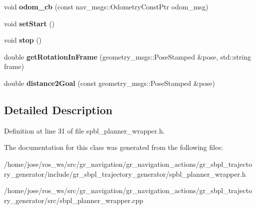 \begin{DoxyCompactItemize}
void {\bfseries odom\+\_\+cb} (const nav\+\_\+msgs\+::\+Odometry\+Const\+Ptr odom\+\_\+msg)
\item 
\mbox{\label{classgr__sbpl__trajectory__generator_1_1GRSBPLPlanner_af1167b856f9bb17b2ad2337726f94209}} 
void {\bfseries set\+Start} ()
\item 
\mbox{\label{classgr__sbpl__trajectory__generator_1_1GRSBPLPlanner_adb56bd9cd625ad10c048a82d8898860c}} 
void {\bfseries stop} ()
\item 
\mbox{\label{classgr__sbpl__trajectory__generator_1_1GRSBPLPlanner_a7956e2577d749607d1babf2b7821ec0e}} 
double {\bfseries get\+Rotation\+In\+Frame} (geometry\+\_\+msgs\+::\+Pose\+Stamped \&pose, std\+::string frame)
\item 
\mbox{\label{classgr__sbpl__trajectory__generator_1_1GRSBPLPlanner_a8fc1bca78a23e51ecc02fa119582dc7c}} 
double {\bfseries distance2\+Goal} (const geometry\+\_\+msgs\+::\+Pose\+Stamped \&pose)
\end{DoxyCompactItemize}


\subsection{Detailed Description}


Definition at line 31 of file spbl\+\_\+planner\+\_\+wrapper.\+h.



The documentation for this class was generated from the following files\+:\begin{DoxyCompactItemize}
\item 
/home/jose/ros\+\_\+ws/src/gr\+\_\+navigation/gr\+\_\+navigation\+\_\+actions/gr\+\_\+sbpl\+\_\+trajectory\+\_\+generator/include/gr\+\_\+sbpl\+\_\+trajectory\+\_\+generator/spbl\+\_\+planner\+\_\+wrapper.\+h\item 
/home/jose/ros\+\_\+ws/src/gr\+\_\+navigation/gr\+\_\+navigation\+\_\+actions/gr\+\_\+sbpl\+\_\+trajectory\+\_\+generator/src/sbpl\+\_\+planner\+\_\+wrapper.\+cpp\end{DoxyCompactItemize}

